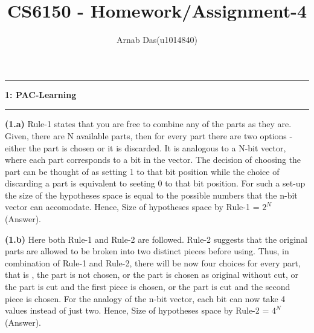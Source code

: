 \documentclass{article}
\title{CS6150 - Homework/Assignment-4}
\author{Arnab Das(u1014840)}
\newcommand\question[2]{\vspace{.25in}\hrule\textbf{#1: #2}\hrule\vspace{.10in}}
\renewcommand\part[1]{\vspace{.10in}\textbf{(#1)}}
\begin{document}
  \maketitle
  \newpage
  \newcommand\NAME{ARNAB DAS}
  \newcommand\UID{uxxxxxxx}
  \newcommand\HWNUM{4}
  
  \question{1}{PAC-Learning}
  \part{1.a} Rule-1 states that you are free to combine any of the parts as they are. Given, there are N available parts, then for every part there are two options - either the part is chosen or it is discarded. It is analogous to a N-bit vector, where each part corresponds to a bit in the vector. The decision of choosing the part can be thought of as setting 1 to that bit position while the choice of discarding a part is equivalent to seeting 0 to that bit position. For such a set-up the size of the hypotheses space is equal to the possible numbers that the n-bit vector can accomodate. Hence,\newline
  \hspace*{0.5cm} Size of hypotheses space by Rule-1 = $2^N$ (Answer). \newline
  
  \part{1.b} Here both Rule-1 and Rule-2 are followed. Rule-2 suggests that the original parts are allowed to be broken into two distinct pieces before using. Thus, in combination of Rule-1 and Rule-2, there will be now four choices for every part, that is , the part is not chosen, or the part is chosen as original without cut, or the part is cut and the first piece is chosen, or the part is cut and the second piece is chosen. For the analogy of the n-bit vector, each bit can now take 4 values instead of just two. Hence, \newline
  \hspace*{0.5cm} Size of hypotheses space by Rule-2 = $4^N$ (Answer). \newline
  
\end{document}
